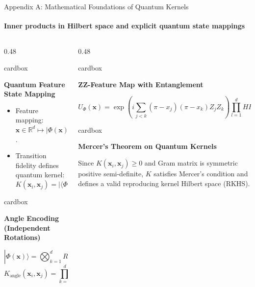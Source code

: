 \documentclass[aspectratio=169, 10pt]{beamer}
\newcommand{\cardbox}[3]{%
  \begin{beamercolorbox}[wd=\linewidth,rounded=true,sep=2.5pt]{cardbox}%
    {\bfseries\scriptsize\color{#1}#2\par}\vspace*{1pt}%
    {\footnotesize #3}%
  \end{beamercolorbox}%
}
\begin{document}
\begin{frame}{Appendix A: Mathematical Foundations of Quantum Kernels}
  \framesubtitle{Inner products in Hilbert space and explicit quantum state mappings}

  \begin{columns}[T]
    \begin{column}{0.48\textwidth}
      \cardbox{DeepPurple}{Quantum Feature State Mapping}{
        \begin{itemize}\setlength\itemsep{1pt}\scriptsize
          \item Feature mapping: $\mathbf{x} \in \mathbb{R}^d \mapsto |\Phi(\mathbf{x})\rangle \in \mathcal{H}$.
          \item Transition fidelity defines quantum kernel:
          \[
            K(\mathbf{x}_i, \mathbf{x}_j) = |\langle\Phi(\mathbf{x}_i)|\Phi(\mathbf{x}_j)\rangle|^2 = \text{Tr}\left(\rho(\mathbf{x}_i)\rho(\mathbf{x}_j)\right)
          \]
        \end{itemize}
      }
      \vspace*{3pt}
      \cardbox{MedPurple}{Angle Encoding (Independent Rotations)}{
        \scriptsize
        \[
          |\Phi(\mathbf{x})\rangle = \bigotimes_{k=1}^d R_y(x_k)|0\rangle
        \]
        \[
          K_{\text{angle}}(\mathbf{x}_i, \mathbf{x}_j) = \prod_{k=1}^d \cos^2\!\left(\frac{x_{ik} - x_{jk}}{2}\right)
        \]
      }
    \end{column}

    \begin{column}{0.48\textwidth}
      \cardbox{TealAccent}{ZZ-Feature Map with Entanglement}{
        \scriptsize
        \[
          U_{\Phi}(\mathbf{x}) = \exp\!\left(i \sum_{j < k} (\pi - x_j)(\pi - x_k) Z_j Z_k\right) \prod_{l=1}^d H R_z(2x_l)
        \]
      }
      \vspace*{3pt}
      \cardbox{CardBg}{Mercer's Theorem on Quantum Kernels}{
        \scriptsize Since $K(\mathbf{x}_i, \mathbf{x}_j) \ge 0$ and Gram matrix is symmetric positive semi-definite, $K$ satisfies Mercer's condition and defines a valid reproducing kernel Hilbert space (RKHS).
      }
    \end{column}
  \end{columns}
\end{frame}
\end{document}
